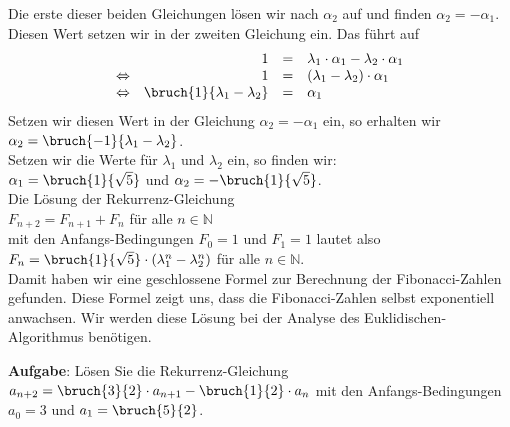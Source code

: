 Die erste dieser beiden Gleichungen l\"osen wir nach $\alpha_2$ auf und finden  $\alpha_2 = - \alpha_1$.
Diesen Wert setzen wir in der zweiten Gleichung ein.  Das f\"uhrt auf
\[
\begin{array}{lrcl}
                 & 1 & = & \lambda_1 \cdot \alpha_1 - \lambda_2 \cdot \alpha_1 \\
 \Leftrightarrow & 1 & = & (\lambda_1 - \lambda_2) \cdot \alpha_1 \\
 \Leftrightarrow & \bruch{1}{\lambda_1 - \lambda_2} & = & \alpha_1 \\
\end{array}
\]
Setzen wir diesen Wert in der Gleichung $\alpha_2 = - \alpha_1$ ein, so erhalten wir \\[0.1cm]
\hspace*{1.3cm} 
  $\alpha_2 = \bruch{- 1}{\lambda_1 - \lambda_2}$.
\\[0.1cm]
Setzen wir die  Werte f\"ur $\lambda_1$ und $\lambda_2$ ein, so finden wir:  \\[0.1cm]
\hspace*{1.3cm} 
$\alpha_1 = \bruch{1}{\sqrt{5}}$ \quad und \quad $\alpha_2 = - \bruch{1}{\sqrt{5}}$.
\\[0.1cm]
Die L\"osung der Rekurrenz-Gleichung \\[0.1cm]
\hspace*{1.3cm} $F_{n+2} = F_{n+1} + F_{n}$ \quad f\"ur alle $n \in \mathbb{N}$ \\[0.1cm]
mit den Anfangs-Bedingungen $F_0 = 1$ und $F_1 = 1$   lautet also 
\\[0.1cm]
\hspace*{1.3cm} 
$F_n = \bruch{1}{\sqrt{5}}\cdot \left( \lambda_1^{n} - \lambda_2^{n} \right)$ 
\quad f\"ur alle $n \in \mathbb{N}$.  
\\[0.1cm]
Damit haben wir eine geschlossene Formel zur Berechnung der Fibonacci-Zahlen
gefunden.  Diese Formel zeigt uns, dass die Fibonacci-Zahlen selbst exponentiell anwachsen.
Wir werden diese L\"osung bei der Analyse des Euklidischen-Algorithmus ben\"otigen.

\vspace*{0.2cm}
\noindent
\textbf{Aufgabe}:  L\"osen Sie die Rekurrenz-Gleichung 
$a_{n+2} = \bruch{3}{2} \cdot a_{n+1} - \bruch{1}{2}\cdot a_n$ mit
den Anfangs-Bedingungen $a_0 = 3$ und $a_1 = \bruch{5}{2}$.


